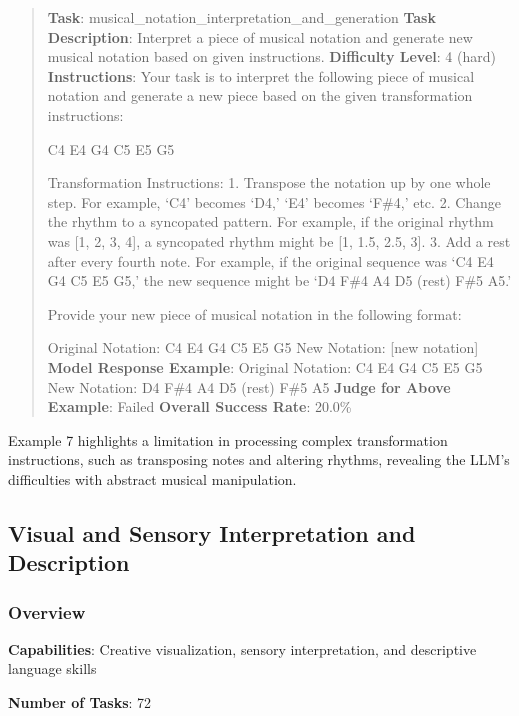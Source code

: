\documentclass[fleqn,10pt]{wlscirep}
\begin{document}
\begin{quote}
\textbf{Task}: musical\_notation\_interpretation\_and\_generation
\textbf{Task Description}: Interpret a piece of musical notation and
generate new musical notation based on given instructions.
\textbf{Difficulty Level}: 4 (hard) \textbf{Instructions}: Your task is
to interpret the following piece of musical notation and generate a new
piece based on the given transformation instructions:

C4 E4 G4 C5 E5 G5

Transformation Instructions: 1. Transpose the notation up by one whole
step. For example, `C4' becomes `D4,' `E4' becomes `F\#4,' etc. 2.
Change the rhythm to a syncopated pattern. For example, if the original
rhythm was {[}1, 2, 3, 4{]}, a syncopated rhythm might be {[}1, 1.5,
2.5, 3{]}. 3. Add a rest after every fourth note. For example, if the
original sequence was `C4 E4 G4 C5 E5 G5,' the new sequence might be `D4
F\#4 A4 D5 (rest) F\#5 A5.'

Provide your new piece of musical notation in the following format:

Original Notation: C4 E4 G4 C5 E5 G5 New Notation: {[}new notation{]}
\textbf{Model Response Example}: Original Notation: C4 E4 G4 C5 E5 G5
New Notation: D4 F\#4 A4 D5 (rest) F\#5 A5 \textbf{Judge for Above
Example}: Failed \textbf{Overall Success Rate}: 20.0\%
\end{quote}

Example 7 highlights a limitation in processing complex transformation
instructions, such as transposing notes and altering rhythms, revealing
the LLM's difficulties with abstract musical manipulation.

\hypertarget{visual-and-sensory-interpretation-and-description}{%
\subsection{Visual and Sensory Interpretation and
Description}\label{visual-and-sensory-interpretation-and-description}}

\hypertarget{overview-9}{%
\subsubsection{Overview}\label{overview-9}}

\textbf{Capabilities}: Creative visualization, sensory interpretation,
and descriptive language skills

\textbf{Number of Tasks}: 72
\end{document}
